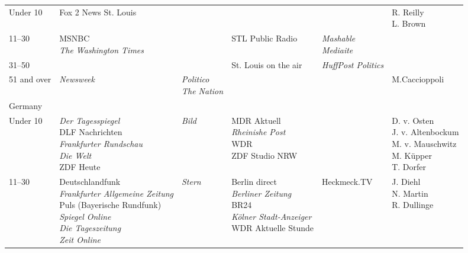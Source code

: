 \begin{table}[ht]
\begin{adjustbox}{width=1\textwidth}
\begin{tabular}{ l  l  l  l  l  l }
			Under 10 & Fox 2 News St. Louis & & & & \makecell[l]{R. Reilly\\L. Brown}\\
			
			11--30 & \makecell[l]{MSNBC\\\textit{The Washington Times}} & & STL Public Radio & \makecell[l]{\textit{Mashable}\\\textit{Mediaite}} & \\
			
			31--50 & & & St. Louis on the air & \textit{HuffPost Politics} & \\
			
			51 and over & \textit{Newsweek} & \makecell[l]{\textit{Politico}\\\textit{The Nation}} & & & M.Caccioppoli \\
			
			Germany&&&&&\\
			
			Under 10 & \makecell[l]{\textit{Der Tagesspiegel}\\DLF Nachrichten\\\textit{Frankfurter Rundschau}\\\textit{Die Welt}\\ZDF Heute} & \textit{Bild} & \makecell[l]{MDR Aktuell\\\textit{Rheinishe Post}\\WDR\\ZDF Studio NRW} & & \makecell[l]{D. v. Osten\\J. v. Altenbockum\\M. v. Mauschwitz\\M. Küpper\\T. Dorfer}\\
			
			11--30 & \makecell[l]{Deutschlandfunk\\\textit{Frankfurter Allgemeine Zeitung}\\Puls (Bayerische Rundfunk)\\\textit{Spiegel Online}\\\textit{Die Tageszeitung}\\\textit{Zeit Online}} & \textit{Stern} & \makecell[l]{Berlin direct\\\textit{Berliner Zeitung}\\BR24\\\textit{Kölner Stadt-Anzeiger}\\WDR Aktuelle Stunde} & Heckmeck.TV & \makecell[l]{J. Diehl\\N. Martin\\R. Dullinge}\\
			

\end{tabular}
\end{adjustbox}
\end{table}

